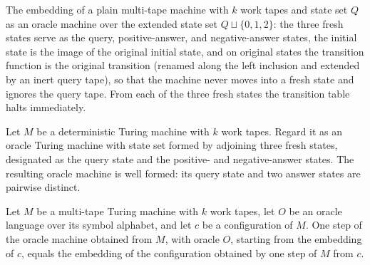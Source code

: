 \begin{definition}
\label{Turing.OracleTM.ofMultiTapeTM}
\leanok
{}
The embedding of a plain multi-tape machine with $k$ work tapes and state set
$Q$ as an oracle machine over the extended state set $Q \sqcup \{0,1,2\}$: the
three fresh states serve as the query, positive-answer, and negative-answer
states, the initial state is the image of the original initial state, and on
original states the transition function is the original transition (renamed
along the left inclusion and extended by an inert query tape), so that the
machine never moves into a fresh state and ignores the query tape.  From each
of the three fresh states the transition table halts immediately.
\end{definition}

\begin{theorem}
\label{Turing.OracleTM.ofMultiTapeTM_wellFormed}
\leanok
{}
Let $M$ be a deterministic Turing machine with $k$ work tapes. Regard it as an oracle
Turing machine with state set formed by adjoining three fresh states, designated as the
query state and the positive- and negative-answer states. The resulting oracle machine
is well formed: its query state and two answer states are pairwise distinct.
\end{theorem}

\begin{lemma}
\label{Turing.OracleTM.step_ofMultiTapeTM}
\leanok
{}
Let $M$ be a multi-tape Turing machine with $k$ work tapes, let $O$ be an oracle
language over its symbol alphabet, and let $c$ be a configuration of $M$. One step of
the oracle machine obtained from $M$, with oracle $O$, starting from the embedding of
$c$, equals the embedding of the configuration obtained by one step of $M$ from $c$.
\end{lemma}

